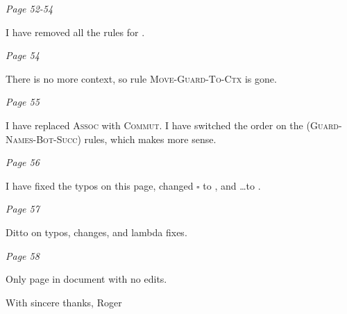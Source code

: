 \documentclass[manuscript,screen, 12pt, nonacm]{acmart}
\begin{document}
\it{Page 52-54}

I have removed all the rules for \PPlus. 

\it{Page 54}

There is no more context, so rule \textsc{Move-Guard-To-Ctx} is gone. 

\it{Page 55}

I have replaced \textsc{Assoc} with \textsc{Commut}. I have switched the order
on the \textsc{(Guard-Names-Bot-Succ)} rules, which makes more sense. 

\it{Page 56}

I have fixed the typos on this page, changed $\square$ to \dbar, and \dots to
\Gs. 

\it{Page 57}

Ditto on typos, changes, and lambda fixes. 

\it{Page 58}

Only page in document with no edits. 


With sincere thanks, 
Roger
\end{document}
